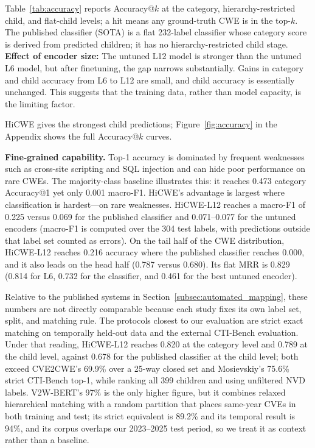 \documentclass[conference,compsoc]{IEEEtran}
\begin{document}
Table~\ref{tab:accuracy} reports Accuracy@$k$ at the category, hierarchy-restricted child, and flat-child levels; a hit means any ground-truth CWE is in the top-$k$. The published classifier (SOTA) is a flat 232-label classifier whose category score is derived from predicted children; it has no hierarchy-restricted child stage. \textbf{Effect of encoder size:} The untuned L12 model is stronger than the untuned L6 model, but after finetuning, the gap narrows substantially. Gains in category and child accuracy from L6 to L12 are small, and child accuracy is essentially unchanged. This suggests that the training data, rather than model capacity, is the limiting factor.

HiCWE gives the strongest child predictions; Figure~\ref{fig:accuracy} in the Appendix shows the full Accuracy@$k$ curves.

\textbf{Fine-grained capability.} Top-1 accuracy is dominated by frequent weaknesses such as cross-site scripting and SQL injection and can hide poor performance on rare CWEs. The majority-class baseline illustrates this: it reaches 0.473 category Accuracy@1 yet only 0.001 macro-F1. HiCWE's advantage is largest where classification is hardest---on rare weaknesses. HiCWE-L12 reaches a macro-F1 of 0.225 versus 0.069 for the published classifier and 0.071--0.077 for the untuned encoders (macro-F1 is computed over the 304 test labels, with predictions outside that label set counted as errors). On the tail half of the CWE distribution, HiCWE-L12 reaches 0.216 accuracy where the published classifier reaches 0.000, and it also leads on the head half (0.787 versus 0.680). Its flat MRR is 0.829 (0.814 for L6, 0.732 for the classifier, and 0.461 for the best untuned encoder).

Relative to the published systems in Section~\ref{subsec:automated_mapping}, these numbers are not directly comparable because each study fixes its own label set, split, and matching rule. The protocols closest to our evaluation are strict exact matching on temporally held-out data and the external CTI-Bench evaluation. Under that reading, HiCWE-L12 reaches 0.820 at the category level and 0.789 at the child level, against 0.678 for the published classifier at the child level; both exceed CVE2CWE's 69.9\% over a 25-way closed set and Mosievskiy's 75.6\% strict CTI-Bench top-1, while ranking all 399 children and using unfiltered NVD labels. V2W-BERT's 97\% is the only higher figure, but it combines relaxed hierarchical matching with a random partition that places same-year CVEs in both training and test; its strict equivalent is 89.2\% and its temporal result is 94\%, and its corpus overlaps our 2023--2025 test period, so we treat it as context rather than a baseline.
\end{document}

